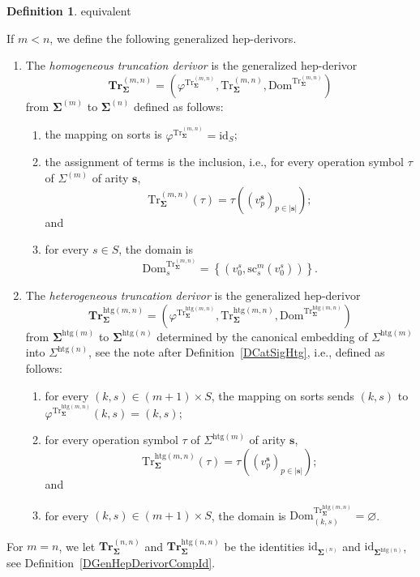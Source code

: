\documentclass[a4paper, reqno]{amsbook}
\makeatletter
\newcommand{\bb}[1]{\ensuremath{\lvert #1 \rvert}}
\newcommand{\sig}[1]{\mathbf{#1}}             %
\newcommand{\Dom}{\mathrm{Dom}}
\newcommand{\htg}{\mathrm{htg}}                %
\newcommand{\id}{\mathrm{id}}
\newcommand{\src}{\mathrm{sc}}
\newcommand{\Tr}{\mathrm{Tr}}
\newcommand{\bTr}{\mathbf{Tr}}
\theoremstyle{plain}
\theoremstyle{definition}
\newtheorem{definition}[theorem]{Definition}
\newcommand*{\CA@leanpending}{}
\newcommand*{\CA@leanrelation}{}
\newcommand*{\lean}[2]{%
  \ifcsname\string\color@lean@#1\endcsname\else
    \PackageError{main}{Unknown relation `#1' in \string\lean}{Use equivalent, weaker or stronger.}%
  \fi
  \gdef\CA@leanrelation{#1}%
  \gdef\CA@leanpending{#2}}
\makeatother
\begin{document}
\begin{definition}\label{DTrDerivor}\lean{equivalent}{Dimensions.homogeneousTruncation,Dimensions.heterogeneousTruncation}
If $m<n$, we define the following generalized hep-derivors.
\begin{enumerate}
\item The \emph{homogeneous truncation derivor} is the generalized hep-derivor
$$
\bTr^{(m,n)}_{\sig{\Sigma}}=\left(\varphi^{\Tr^{(m,n)}_{\sig{\Sigma}}},\Tr^{(m,n)}_{\sig{\Sigma}},\Dom^{\Tr^{(m,n)}_{\sig{\Sigma}}}\right)
$$
from $\sig{\Sigma}^{(m)}$ to $\sig{\Sigma}^{(n)}$ defined as follows:
\begin{enumerate}
\item the mapping on sorts is $\varphi^{\Tr^{(m,n)}_{\sig{\Sigma}}}=\id_{S}$;
\item the assignment of terms is the inclusion, i.e., for every operation symbol $\tau$ of $\Sigma^{(m)}$ of arity $\mathbf{s}$,
$$
\Tr^{(m,n)}_{\sig{\Sigma}}(\tau)=\tau((v^{\mathbf{s}}_{p})_{p\in\bb{\mathbf{s}}});
$$
and
\item for every $s\in S$, the domain is
$$
\Dom^{\Tr^{(m,n)}_{\sig{\Sigma}}}_{s}=\left\lbrace\left(v^{s}_{0},\src^{m}_{s}(v^{s}_{0})\right)\right\rbrace.
$$
\end{enumerate}
\item The \emph{heterogeneous truncation derivor} is the generalized hep-derivor
$$
\bTr^{\htg(m,n)}_{\sig{\Sigma}}=\left(\varphi^{\Tr^{\htg(m,n)}_{\sig{\Sigma}}},\Tr^{\htg(m,n)}_{\sig{\Sigma}},\Dom^{\Tr^{\htg(m,n)}_{\sig{\Sigma}}}\right)
$$
from $\sig{\Sigma}^{\htg(m)}$ to $\sig{\Sigma}^{\htg(n)}$ determined by the canonical embedding of $\Sigma^{\htg(m)}$ into $\Sigma^{\htg(n)}$, see the note after Definition~\ref{DCatSigHtg}, i.e., defined as follows:
\begin{enumerate}
\item for every $(k,s)\in(m+1)\times S$, the mapping on sorts sends $(k,s)$ to $\varphi^{\Tr^{\htg(m,n)}_{\sig{\Sigma}}}(k,s)=(k,s)$;
\item for every operation symbol $\tau$ of $\Sigma^{\htg(m)}$ of arity $\mathbf{s}$,
$$
\Tr^{\htg(m,n)}_{\sig{\Sigma}}(\tau)=\tau((v^{\mathbf{s}}_{p})_{p\in\bb{\mathbf{s}}});
$$
and
\item for every $(k,s)\in(m+1)\times S$, the domain is $\Dom^{\Tr^{\htg(m,n)}_{\sig{\Sigma}}}_{(k,s)}=\varnothing$.
\end{enumerate}
\end{enumerate}
For $m=n$, we let $\bTr^{(n,n)}_{\sig{\Sigma}}$ and $\bTr^{\htg(n,n)}_{\sig{\Sigma}}$ be the identities $\id_{\sig{\Sigma}^{(n)}}$ and $\id_{\sig{\Sigma}^{\htg(n)}}$, see Definition~\ref{DGenHepDerivorCompId}.
\end{definition}
\end{document}
